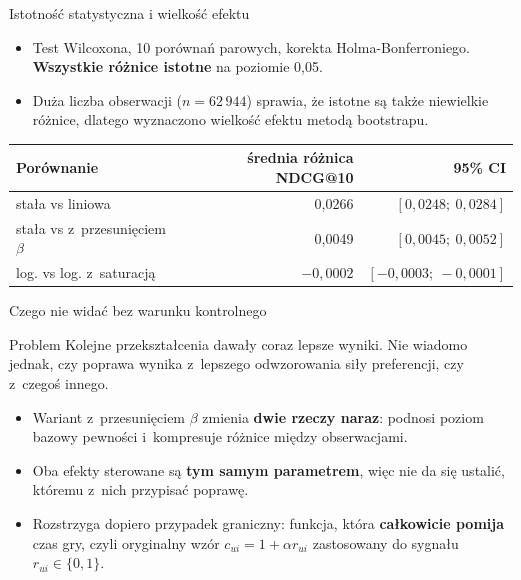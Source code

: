 \documentclass[aspectratio=169,11pt]{beamer}
\makeatletter
\newcommand{\ndcg}{NDCG@10}
\makeatother
\begin{document}

\begin{frame}{Istotność statystyczna i wielkość efektu}
\begin{itemize}
  \item Test Wilcoxona, 10 porównań parowych, korekta Holma-Bonferroniego. \textbf{Wszystkie różnice istotne} na poziomie 0,05.

  \item Duża liczba obserwacji ($n = 62\,944$) sprawia, że istotne są także niewielkie różnice, dlatego wyznaczono wielkość efektu metodą bootstrapu.

\end{itemize}

  \vspace{0.6em}
  \begin{center}
    \small
    \begin{tabular}{lrr}
      \toprule
      Porównanie & średnia różnica \ndcg{} & 95\% CI \\
      \midrule
      stała vs liniowa & 0,0266 & $[0{,}0248;\ 0{,}0284]$ \\
      stała vs z~przesunięciem $\beta$ & 0,0049 & $[0{,}0045;\ 0{,}0052]$ \\
      log. vs log. z~saturacją & $-0{,}0002$ & $[-0{,}0003;\ -0{,}0001]$ \\
      \bottomrule
    \end{tabular}
  \end{center}

\end{frame}


\begin{frame}{Czego nie widać bez warunku kontrolnego}

  \begin{block}{Problem}
    Kolejne przekształcenia dawały coraz lepsze wyniki. Nie wiadomo jednak,
    czy poprawa wynika z~lepszego odwzorowania siły preferencji, czy z~czegoś innego.
  \end{block}

  \vspace{0.8em}
  \begin{itemize}
    \item Wariant z~przesunięciem $\beta$ zmienia \textbf{dwie rzeczy naraz}: podnosi
          poziom bazowy pewności i~kompresuje różnice między obserwacjami.

    \item Oba efekty sterowane są \textbf{tym samym parametrem}, więc nie da się ustalić,
          któremu z~nich przypisać poprawę.

    \item Rozstrzyga dopiero przypadek graniczny: funkcja, która \textbf{całkowicie
          pomija} czas gry, czyli oryginalny wzór $c_{ui} = 1 + \alpha r_{ui}$
          zastosowany do sygnału $r_{ui} \in \{0,1\}$.
  \end{itemize}

\end{frame}
\end{document}
